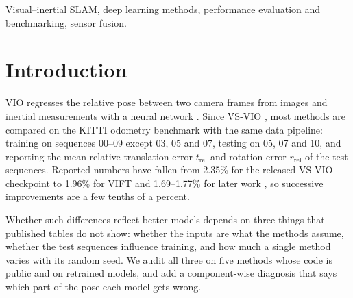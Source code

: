 \documentclass[letterpaper,journal]{IEEEtran}
\newcommand{\trel}{t_{\mathrm{rel}}}
\newcommand{\rrel}{r_{\mathrm{rel}}}
\begin{document}
\begin{IEEEkeywords}
Visual--inertial SLAM, deep learning methods, performance evaluation and benchmarking, sensor fusion.
\end{IEEEkeywords}

\section{Introduction}

 VIO regresses the relative pose between two camera frames from images and inertial measurements with a neural network \cite{Clark2017,Han2019,Yang2022,Kurt2024}. Since VS-VIO \cite{Yang2022}, most methods are compared on the KITTI odometry benchmark \cite{Geiger2012,Geiger2013} with the same data pipeline: training on sequences 00--09 except 03, 05 and 07, testing on 05, 07 and 10, and reporting the mean relative translation error $\trel$ and rotation error $\rrel$ of the test sequences. Reported numbers have fallen from 2.35\% for the released VS-VIO checkpoint to 1.96\% for VIFT \cite{Kurt2024} and 1.69--1.77\% for later work \cite{Ma2026,Wan2026}, so successive improvements are a few tenths of a percent.

Whether such differences reflect better models depends on three things that published tables do not show: whether the inputs are what the methods assume, whether the test sequences influence training, and how much a single method varies with its random seed. We audit all three on five methods whose code is public and on retrained models, and add a component-wise diagnosis that says which part of the pose each model gets wrong.
\end{document}
